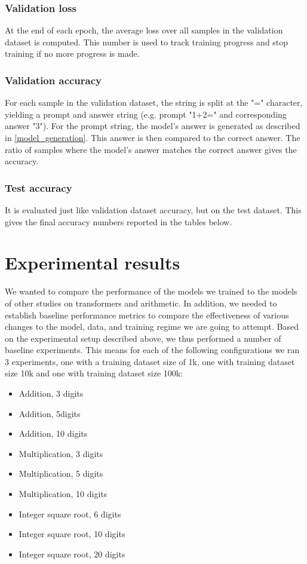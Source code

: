 \subsubsection{Validation loss}
At the end of each epoch, the average loss over all samples in the validation dataset is computed. This number is used to track training progress and stop training if no more progress is made.

\subsubsection{Validation accuracy}
For each sample in the validation dataset, the string is split at the "=" character, yielding a prompt and answer string (e.g. prompt "1+2=" and corresponding answer "3"). For the prompt string, the model's answer is generated as described in \cref{model_generation}. This answer is then compared to the correct answer. The ratio of samples where the model's answer matches the correct answer gives the accuracy.

\subsubsection{Test accuracy}
It is evaluated just like validation dataset accuracy, but on the test dataset. This gives the final accuracy numbers reported in the tables below.







\section{Experimental results}

\label{baseline}

We wanted to compare the performance of the models we trained to the models of other studies on transformers and arithmetic. In addition, we needed to establish baseline performance metrics to compare the effectiveness of various changes to the model, data, and training regime we are going to attempt.
Based on the experimental setup described above, we thus performed a number of baseline experiments. This means for each of the following configurations we ran 3 experiments, one with a training dataset size of 1k, one with training dataset size 10k and one with training dataset size 100k:

\begin{itemize}
	\item Addition, 3 digits
	\item Addition, 5digits
	\item Addition, 10 digits
	\item Multiplication, 3 digits
	\item Multiplication, 5 digits
	\item Multiplication, 10 digits
	\item Integer square root, 6 digits
	\item Integer square root, 10 digits
	\item Integer square root, 20 digits
\end{itemize}

